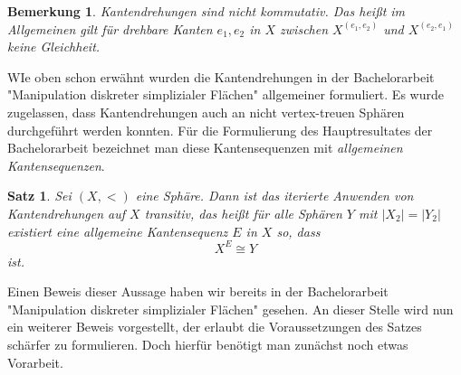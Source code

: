 \documentclass[12pt,titlepage,twoside,cleardoublepage]{article}
\theoremstyle{nummermitklammern}
\newtheorem{bemerkung}[temp]{Bemerkung}
\newtheorem{satz}[temp]{Satz}
\newtheorem{bemerkung}[zahl]{Bemerkung}
\newtheorem{satz}[zahl]{Satz}
\numberwithin{equation}{section}
\begin{document}
\begin{bemerkung}
Kantendrehungen sind nicht kommutativ. Das heißt im Allgemeinen gilt für drehbare Kanten $e_1,e_2$ in $X$ zwischen $X^{(e_1,e_2)}$ und $X^{(e_2,e_1)}$ keine Gleichheit. 

\end{bemerkung}

WIe oben schon erwähnt wurden die Kantendrehungen in der Bachelorarbeit "Manipulation diskreter simplizialer Flächen" allgemeiner formuliert. Es wurde zugelassen, dass Kantendrehungen auch an nicht vertex-treuen Sphären durchgeführt werden konnten. Für die Formulierung des Hauptresultates der Bachelorarbeit bezeichnet man diese Kantensequenzen mit \emph{allgemeinen Kantensequenzen}.
\begin{satz}
Sei $(X,<)$ eine Sphäre. Dann ist das iterierte Anwenden von Kantendrehungen auf $X$ transitiv, 
 das heißt für alle Sphären $Y$ mit $\vert X_2\vert=\vert Y_2\vert$ existiert eine allgemeine Kantensequenz $E$ in $X$ so, dass 
\[
X^E \cong Y
\]
ist. 
\end{satz}
Einen Beweis dieser Aussage haben wir bereits in der Bachelorarbeit "Manipulation diskreter simplizialer Flächen"  gesehen. An dieser Stelle wird nun ein weiterer Beweis vorgestellt, der erlaubt die Voraussetzungen des Satzes schärfer zu formulieren. Doch hierfür benötigt man zunächst noch etwas Vorarbeit.
\end{document}
